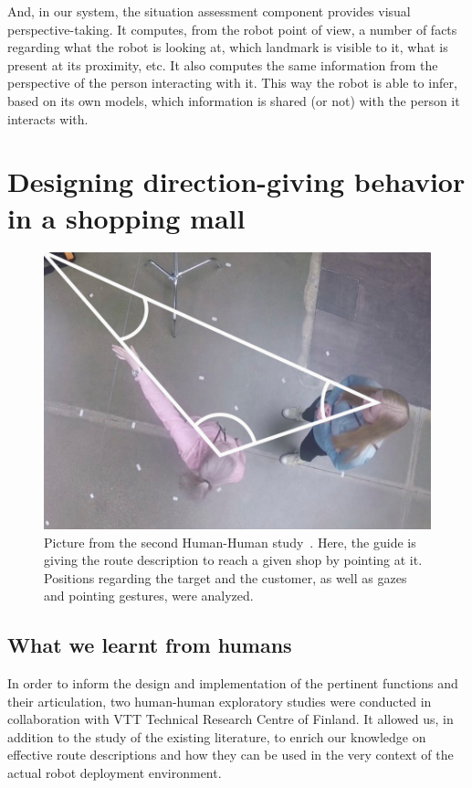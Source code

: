 \documentclass[a4paper,11pt,twoside]{StyleThese}
\begin{document}
And, in our system, the situation assessment component provides visual perspective-taking. It computes, from the robot point of view, a number of facts regarding what the robot is looking at, which landmark is visible to it, what is present at its proximity, etc. It also computes the same information from the perspective of the person interacting with it. This way the robot is able to infer, based on its own models, which information is shared (or not) with the person it interacts with.


\section{Designing direction-giving behavior in a shopping mall}
\label{sec:modeling}

\begin{figure}[!t]
	\centering
	\includegraphics[scale=0.7]{figures/chapter3/human_guide.png}
	\caption{\label{fig:chap3_human_guide} Picture from the second Human-Human study~\cite{belhassein_2017_human}. Here, the guide is giving the route description to reach a given shop by pointing at it. Positions regarding the target and the customer, as well as gazes and pointing gestures, were analyzed.}
\end{figure}

\subsection{What we learnt from humans}\label{sec:methodology}
In order to inform the design and implementation of the pertinent functions and their articulation, two human-human exploratory studies were conducted in collaboration with VTT Technical Research Centre of Finland. It allowed us, in addition to the study of the existing literature, to enrich our knowledge on effective route descriptions and how they can be used in the very context of the actual robot deployment environment. 
\end{document}
